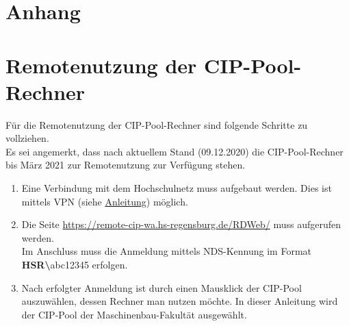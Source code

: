 \documentclass[13pt,a4paper, listof=entryprefix, bibliography=totocnumbered,toc=listofnumbered,lof=listofnumbered]{scrartcl}
\begin{document}
		\begin{appendix}
			 \label{Anhang}
			\section*{Anhang} %
			\renewcommand{\thesection}{\Roman{section}}

			\setcounter{section}{0} %
			\section{Remotenutzung der CIP-Pool-Rechner}
			\label{app:remotenutzung}
			Für die Remotenutzung der CIP-Pool-Rechner sind folgende Schritte zu vollziehen. \\
			Es sei angemerkt, dass nach aktuellem Stand (09.12.2020) die CIP-Pool-Rechner bis März 2021 zur Remotenutzung zur Verfügung stehen.
			
			\begin{enumerate}
				\item Eine Verbindung mit dem Hochschulnetz muss aufgebaut werden. Dies ist mittels VPN (siehe \href{https://www.oth-regensburg.de/supportwiki/doku.php?id=public:netz:vpn-forticlient}{\underline{Anleitung}}) möglich.
				
				\item Die Seite \url{https://remote-cip-wa.hs-regensburg.de/RDWeb/} muss aufgerufen werden. \\
				Im Anschluss muss die Anmeldung mittels NDS-Kennung im Format \textbf{HSR\textbackslash}abc12345 erfolgen.
				
				\smallskip
				\item Nach erfolgter Anmeldung ist durch einen Mausklick der CIP-Pool auszuwählen, dessen Rechner man nutzen möchte. In dieser Anleitung wird der CIP-Pool der Maschinenbau-Fakultät ausgewählt.
				
				

\end{enumerate}
\end{appendix}
\end{document}

